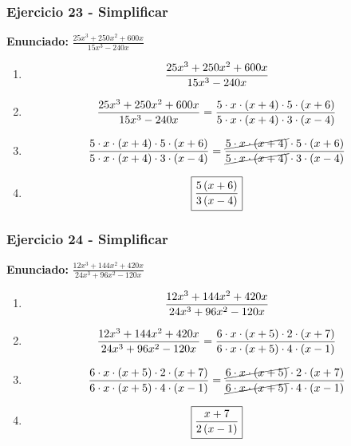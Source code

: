 \documentclass[11pt,a4paper]{article}
\newcommand{\fitmath}[1]{%
\[
\setbox0=\hbox{$\displaystyle #1$}%
\ifdim\wd0>\linewidth
\resizebox{\linewidth}{!}{$\displaystyle #1$}%
\else
#1%
\fi
\]
}
\begin{document}
\vspace{0.12cm}
\subsubsection*{Ejercicio 23 - Simplificar}
\textbf{Enunciado:} $ \frac{25 x^{3} + 250 x^{2} + 600 x}{15 x^{3} - 240 x} $\par
\begin{enumerate}[leftmargin=2em]
\item \fitmath{\frac{25 x^{3} + 250 x^{2} + 600 x}{15 x^{3} - 240 x}}
\item \fitmath{\frac{25 x^{3} + 250 x^{2} + 600 x}{15 x^{3} - 240 x}=\frac{5\cdot x\cdot \left(x + 4\right)\cdot 5\cdot \left(x + 6\right)}{5\cdot x\cdot \left(x + 4\right)\cdot 3\cdot \left(x - 4\right)}}
\item \fitmath{\frac{5\cdot x\cdot \left(x + 4\right)\cdot 5\cdot \left(x + 6\right)}{5\cdot x\cdot \left(x + 4\right)\cdot 3\cdot \left(x - 4\right)}=\frac{\cancel{5\cdot x\cdot \left(x + 4\right)}\cdot 5\cdot \left(x + 6\right)}{\cancel{5\cdot x\cdot \left(x + 4\right)}\cdot 3\cdot \left(x - 4\right)}}
\item \fitmath{\boxed{\frac{5 \left(x + 6\right)}{3 \left(x - 4\right)}}}
\end{enumerate}

\vspace{0.12cm}
\subsubsection*{Ejercicio 24 - Simplificar}
\textbf{Enunciado:} $ \frac{12 x^{3} + 144 x^{2} + 420 x}{24 x^{3} + 96 x^{2} - 120 x} $\par
\begin{enumerate}[leftmargin=2em]
\item \fitmath{\frac{12 x^{3} + 144 x^{2} + 420 x}{24 x^{3} + 96 x^{2} - 120 x}}
\item \fitmath{\frac{12 x^{3} + 144 x^{2} + 420 x}{24 x^{3} + 96 x^{2} - 120 x}=\frac{6\cdot x\cdot \left(x + 5\right)\cdot 2\cdot \left(x + 7\right)}{6\cdot x\cdot \left(x + 5\right)\cdot 4\cdot \left(x - 1\right)}}
\item \fitmath{\frac{6\cdot x\cdot \left(x + 5\right)\cdot 2\cdot \left(x + 7\right)}{6\cdot x\cdot \left(x + 5\right)\cdot 4\cdot \left(x - 1\right)}=\frac{\cancel{6\cdot x\cdot \left(x + 5\right)}\cdot 2\cdot \left(x + 7\right)}{\cancel{6\cdot x\cdot \left(x + 5\right)}\cdot 4\cdot \left(x - 1\right)}}
\item \fitmath{\boxed{\frac{x + 7}{2 \left(x - 1\right)}}}
\end{enumerate}
\end{document}
